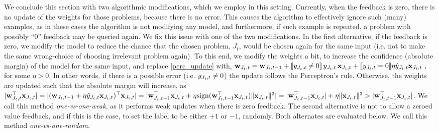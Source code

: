 We conclude this section with two algorithmic modifications, which we employ in this setting. Currently, when the feedback is zero, there is no update of the weights  for those problems, because there is no error. This causes the algorithm to effectively ignore such (many) examples, as in these cases the algorithm is not modifying any model, and furthermore, if such example is repeated, a problem with possibly ``0'' feedback may be queried again. 
%
We fix this issue with one of the two modifications. In the first alternative, if the feedback is zero, we modify the model to reduce the chance that the chosen problem, $J_t$, would be chosen again for the same input (i.e. not to make the same wrong-choice of choosing irrelevant problem again). To this end, we modify the weights a bit, to increase the confidence (absolute margin) of the model for the same input, and replace \eqref{perc_update} with,
\(
\mathbf{w}_{J_t,t} = \mathbf{w}_{J_t,t-1}+ [\![{y_{J_t,t}\ne0}]\!] \, y_{J_t,t}\, \mathbf{x}_{J_t,t} +
 [\![{y_{J_t,t}=0}]\!] \eta \hat{y}_{J_t,t}\mathbf{x}_{J_t,t}~,
\)
for some $\eta>0$. In other words, if there is a possible error (i.e. $y_{J_t,t}\ne0$) the update follows the Perceptron's rule. Otherwise, the weights are updated such that the absolute margin will increase, as $\vert {\mathbf{w}}^{\top}_{J_t,t} \mathbf{x}_{J_t,t} \vert = \vert 
(\mathbf{w}_{J_t,t-1}+ \eta \hat{y}_{J_t,t}\mathbf{x}_{J_t,t})^\top\mathbf{x}_{J_t,t}\vert = \vert {\mathbf{w}}^{\top}_{J_t,t-1}\mathbf{x}_{J_t,t}+ \eta {\rm sign}({\mathbf{w}}^{\top}_{J_t,t-1}\mathbf{x}_{J_t,t}) \Vert\mathbf{x}_{J_t,t}\Vert^2 \vert = 
\vert {\mathbf{w}}^{\top}_{J_t,t-1}\mathbf{x}_{J_t,t}\vert + \eta \Vert\mathbf{x}_{J_t,t}\Vert^2 > \vert {\mathbf{w}}^{\top}_{J_t,t-1}\mathbf{x}_{J_t,t}\vert$. We call this method {\em one-vs-one-weak}, as it performs weak updates when there is zero feedback. The second alternative is not to allow a zeroed value feedback, and if this is the case, to set the label to be either $+1$ or $-1$, randomly. Both alternates are evaluated below. We call this method {\em one-vs-one-random}.



